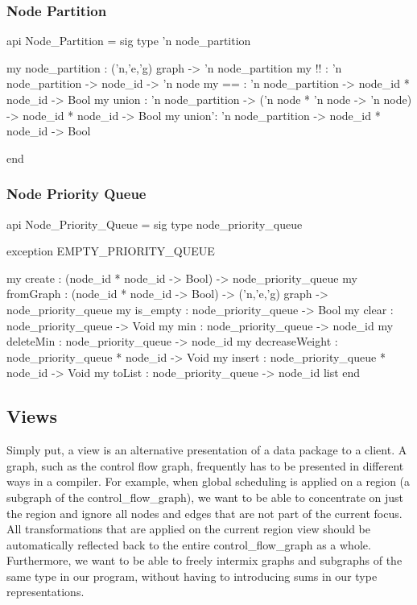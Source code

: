 \subsubsection{Node Partition}
\begin{SML}
 api Node_Partition = sig 
   type 'n node_partition

   my node_partition : ('n,'e,'g) graph -> 'n node_partition
   my !!    : 'n node_partition -> node_id -> 'n node
   my ==    : 'n node_partition -> node_id * node_id -> Bool
   my union : 'n node_partition -> ('n node * 'n node -> 'n node) ->
                                        node_id * node_id -> Bool
   my union': 'n node_partition -> node_id * node_id -> Bool

 end
\end{SML}

\subsubsection{Node Priority Queue}
\begin{SML}
 api Node_Priority_Queue = sig 
   type node_priority_queue

   exception EMPTY_PRIORITY_QUEUE

   my create         : (node_id * node_id -> Bool) -> node_priority_queue
   my fromGraph      : (node_id * node_id -> Bool) -> 
      ('n,'e,'g) graph -> node_priority_queue
   my is_empty        : node_priority_queue -> Bool
   my clear          : node_priority_queue -> Void
   my min            : node_priority_queue -> node_id
   my deleteMin      : node_priority_queue -> node_id
   my decreaseWeight : node_priority_queue * node_id -> Void
   my insert         : node_priority_queue * node_id -> Void
   my toList         : node_priority_queue -> node_id list
 end
\end{SML}

\subsection{Views}\label{sec:views}
Simply put, a view is an alternative presentation
of a data package to a client.  A graph, such as the control flow
graph, frequently has to be presented in different ways in a compiler.  
For example, when global scheduling is applied on a region 
(a subgraph of the control_flow_graph),
we want to be able to concentrate on just the region and ignore all
nodes and edges that are not part of the current focus.  
All transformations that are applied on the current region view should be
automatically reflected back to the entire control_flow_graph as a whole.
Furthermore, we want to be able to freely intermix
graphs and subgraphs of the same type in our program, without having
to introducing sums in our type representations.

